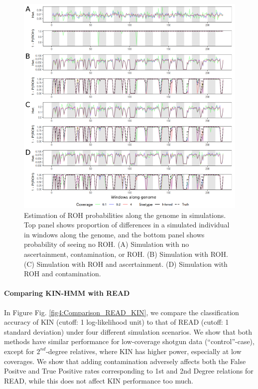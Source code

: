 \documentclass[12pt, letterpaper]{article}
\begin{document}
\begin{figure}[h!]
    \includegraphics[width=16cm]{plots/inkscape_finalImg/ROHplot_final.png}
    \centering
    \caption{Estimation of ROH probabilities along the genome in simulations. Top panel shows proportion of differences in a simulated individual in windows along the genome, and the bottom panel shows probability of seeing no ROH. (A) Simulation with no ascertainment, contamination, or ROH. (B) Simulation with ROH. (C) Simulation with ROH and ascertainment. (D) Simulation with ROH and contamination.}
    \label{fig2:ROH}
\end{figure}

\paragraph{Comparing KIN-HMM with READ}
In Figure Fig. \ref{fig4:Comparison_READ_KIN}, we compare the classification accuracy of KIN (cutoff: 1 log-likelihood unit) to that of READ (cutoff: 1 standard deviation)  under four different simulation scenarios. We show that both methods have similar performance for low-coverage shotgun data (``control''-case),  except for $2^{nd}$-degree relatives, where KIN has higher power, especially at low coverages. We show that adding contamination adversely affects both the False Positve and True Positive rates corresponding to 1st and 2nd Degree relations for READ, while this does not affect KIN performance too much.
\end{document}
